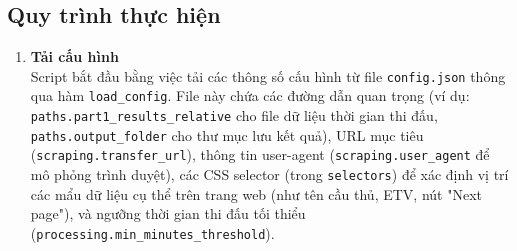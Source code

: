 \documentclass[12pt, a4paper]{report}
\begin{document}
\subsection{Quy trình thực hiện}
\begin{enumerate}[label=\textbf{Bước \arabic*:}, leftmargin=* , itemsep=1ex]
    \item \textbf{Tải cấu hình} \\
    Script bắt đầu bằng việc tải các thông số cấu hình từ file \texttt{config.json} thông qua hàm \texttt{load\_config}.
    File này chứa các đường dẫn quan trọng (ví dụ: \texttt{paths.part1\_results\_relative} cho file dữ liệu thời gian thi đấu, \texttt{paths.output\_folder} cho thư mục lưu kết quả), URL mục tiêu (\texttt{scraping.transfer\_url}), thông tin user-agent (\texttt{scraping.user\_agent} để mô phỏng trình duyệt), các CSS selector (trong \texttt{selectors}) để xác định vị trí các mẩu dữ liệu cụ thể trên trang web (như tên cầu thủ, ETV, nút "Next page"), và ngưỡng thời gian thi đấu tối thiểu (\texttt{processing.min\_minutes\_threshold}).


\end{enumerate}
\end{document}
